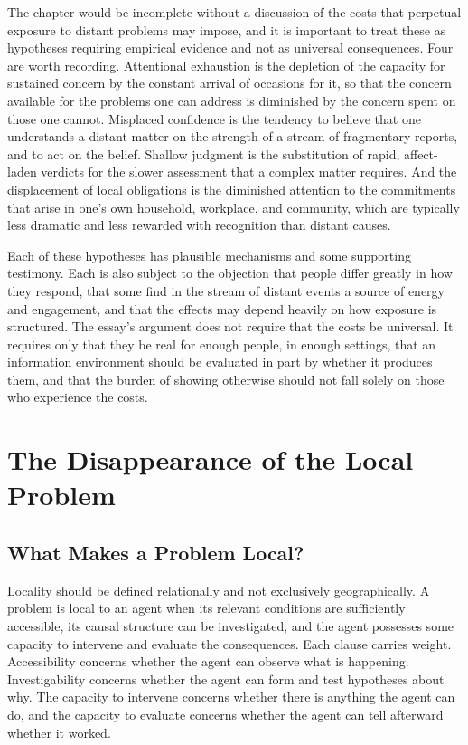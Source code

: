 \documentclass[11pt]{report}
\theoremstyle{definition}
\theoremstyle{remark}
\begin{document}
The chapter would be incomplete without a discussion of the costs that perpetual exposure to distant problems may impose, and it is important to treat these as hypotheses requiring empirical evidence and not as universal consequences. Four are worth recording. Attentional exhaustion is the depletion of the capacity for sustained concern by the constant arrival of occasions for it, so that the concern available for the problems one can address is diminished by the concern spent on those one cannot. Misplaced confidence is the tendency to believe that one understands a distant matter on the strength of a stream of fragmentary reports, and to act on the belief. Shallow judgment is the substitution of rapid, affect-laden verdicts for the slower assessment that a complex matter requires. And the displacement of local obligations is the diminished attention to the commitments that arise in one's own household, workplace, and community, which are typically less dramatic and less rewarded with recognition than distant causes.

Each of these hypotheses has plausible mechanisms and some supporting testimony. Each is also subject to the objection that people differ greatly in how they respond, that some find in the stream of distant events a source of energy and engagement, and that the effects may depend heavily on how exposure is structured. The essay's argument does not require that the costs be universal. It requires only that they be real for enough people, in enough settings, that an information environment should be evaluated in part by whether it produces them, and that the burden of showing otherwise should not fall solely on those who experience the costs.

\chapter{The Disappearance of the Local Problem}

\section{What Makes a Problem Local?}

Locality should be defined relationally and not exclusively geographically. A problem is local to an agent when its relevant conditions are sufficiently accessible, its causal structure can be investigated, and the agent possesses some capacity to intervene and evaluate the consequences. Each clause carries weight. Accessibility concerns whether the agent can observe what is happening. Investigability concerns whether the agent can form and test hypotheses about why. The capacity to intervene concerns whether there is anything the agent can do, and the capacity to evaluate concerns whether the agent can tell afterward whether it worked.
\end{document}
